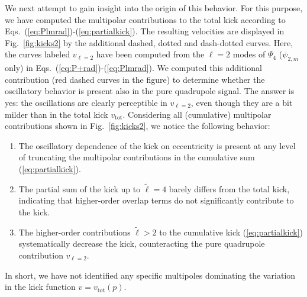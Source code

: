 \documentclass[floats,floatfix,showpacs,amssymb,prd,twocolumn,superscriptaddress,nofootinbib,nolongbibliography,reprint]{revtex4-2}
\newcounter{count}
\newcommand{\mr}[1]{{\textcolor{cyan}{\sf{[MR: #1]}} }}
\begin{document}
We next attempt to gain insight into the origin of this
behavior. For this purpose, we have computed the
multipolar contributions to the total kick according to
Eqs.~(\ref{eq:Plmrad})-(\ref{eq:partialkick}). The resulting
velocities are displayed in Fig.~\ref{fig:kicks2} by the additional
dashed, dotted and dash-dotted curves. 
Here, the curves labeled
$v_{\ell=2}$ have been computed from the $\ell=2$ modes of $\Psi_4$
($\psi_{2,m}$ only) in Eqs.~(\ref{eq:P+rad})-(\ref{eq:Plmrad}).
We computed this additional contribution (red dashed curves in the
figure) to determine whether the oscillatory behavior is present also
in the pure quadrupole signal. The answer is yes: the oscillations are
clearly perceptible in $v_{\ell=2}$, even though they are a bit milder
than in the total kick $v_{\mathrm{tot}}$. Considering all
(cumulative) multipolar contributions shown in Fig.~\ref{fig:kicks2},
we notice the following behavior:
%
\begin{enumerate}[label=(\arabic*)]
 \item The oscillatory dependence of the kick on eccentricity
       is present at any level of truncating the multipolar
       contributions in the cumulative sum (\ref{eq:partialkick}).
 \item The partial sum of the kick up to $\tilde{\ell}=4$
       barely differs from the total kick, indicating that
       higher-order overlap terms do not significantly
       contribute to the kick.
 \item The higher-order contributions $\tilde{\ell}>2$
       to the cumulative kick (\ref{eq:partialkick})
       systematically decrease the kick, counteracting
       the pure quadrupole contribution $v_{\ell=2}$.
\end{enumerate}
%
In short, we have not identified any specific multipoles
dominating the variation in the kick function $v=v_{\mathrm{tot}}(p)$.
\end{document}
